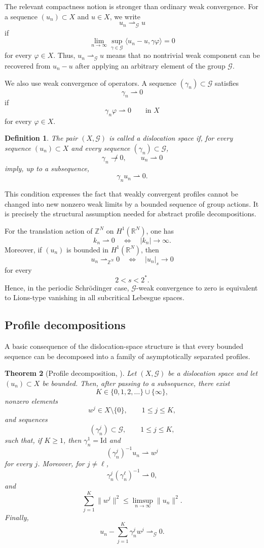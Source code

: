 \documentclass[10pt,a4paper]{amsart}
\numberwithin{equation}{section}
\newtheorem{theorem}{Theorem}[section]
\newtheorem{definition}[theorem]{Definition}
\newcommand{\R}{\mathbb{R}}
\newcommand{\Z}{\mathbb{Z}}
\newcommand{\cG}{\mathcal{G}}
\begin{document}
The relevant compactness notion is stronger than ordinary weak convergence.
For a sequence $(u_n)\subset X$ and $u\in X$, we write
\[
u_n\rightharpoonup_{\cG} u
\]
if
\[
\lim_{n\to\infty}
\sup_{\gamma\in\cG}
\langle u_n-u,\gamma\varphi\rangle
=0
\]
for every $\varphi\in X$. Thus, $u_n\rightharpoonup_{\cG} u$ means that no
nontrivial weak component can be recovered from $u_n-u$ after applying an
arbitrary element of the group $\cG$.

We also use weak convergence of operators. A sequence $(\gamma_n)\subset\cG$
satisfies
\[
\gamma_n\rightharpoonup 0
\]
if
\[
\gamma_n\varphi\rightharpoonup 0
\qquad\text{in }X
\]
for every $\varphi\in X$.

\begin{definition}
The pair $(X,\cG)$ is called a \emph{dislocation space} if, for every
sequence $(u_n)\subset X$ and every sequence $(\gamma_n)\subset\cG$,
\[
\gamma_n\not\rightharpoonup 0,
\qquad
u_n\rightharpoonup 0
\]
imply, up to a subsequence,
\[
\gamma_nu_n\rightharpoonup 0.
\]
\end{definition}

This condition expresses the fact that weakly convergent profiles cannot
be changed into new nonzero weak limits by a bounded sequence of group
actions. It is precisely the structural assumption needed for abstract
profile decompositions.

For the translation action of $\Z^N$ on $H^1(\R^N)$, one has
\[
k_n\rightharpoonup 0
\quad\Longleftrightarrow\quad
|k_n|\to\infty.
\]
Moreover, if $(u_n)$ is bounded in $H^1(\R^N)$, then
\[
u_n\rightharpoonup_{\Z^N}0
\quad\Longleftrightarrow\quad
|u_n|_s\to0
\]
for every
\[
2<s<2^*.
\]
Hence, in the periodic Schr\"odinger case, $\cG$-weak convergence to zero is
equivalent to Lions-type vanishing in all subcritical Lebesgue spaces.

\subsection{Profile decompositions}

A basic consequence of the dislocation-space structure is that every
bounded sequence can be decomposed into a family of asymptotically
separated profiles.

\begin{theorem}[Profile decomposition, {\cite[Theorem 3.1]{TintarevFieseler}}]
Let $(X,\cG)$ be a dislocation space and let $(u_n)\subset X$ be bounded.
Then, after passing to a subsequence, there exist
\[
K\in\{0,1,2,\ldots\}\cup\{\infty\},
\]
nonzero elements
\[
w^j\in X\setminus\{0\},
\qquad
1\leq j\leq K,
\]
and sequences
\[
(\gamma_n^j)\subset\cG,
\qquad
1\leq j\leq K,
\]
such that, if $K\geq1$, then $\gamma_n^1=\mathrm{Id}$ and
\[
(\gamma_n^j)^{-1}u_n\rightharpoonup w^j
\]
for every $j$. Moreover, for $j\neq\ell$,
\[
\gamma_n^j(\gamma_n^\ell)^{-1}\rightharpoonup0,
\]
and
\[
\sum_{j=1}^K\|w^j\|^2
\leq
\limsup_{n\to\infty}\|u_n\|^2.
\]
Finally,
\[
u_n-\sum_{j=1}^K \gamma_n^j w^j
\rightharpoonup_{\cG}0.
\]
\end{theorem}
\end{document}
